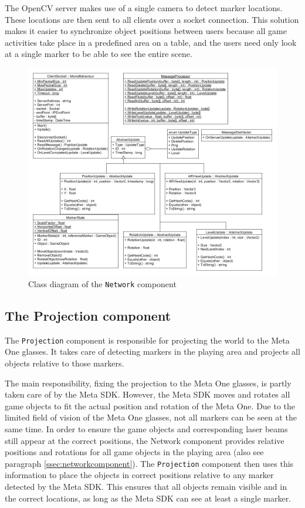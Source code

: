 			The OpenCV server makes use of a single camera to detect marker locations.
			These locations are then sent to all clients over a socket connection.
			This solution makes it easier to synchronize object positions between users
			because all game activities take place in a predefined area on a table,
			and the users need only look at a single marker to be able to see the 
			entire scene. 
			
			\begin{figure}[ht]
				\includegraphics[width=\textwidth]{ClassDiagramNetwork}
				\caption{Class diagram of the \texttt{Network} component}
				\label{fig:classdiagramnetwork}
			\end{figure}
			
		\subsection{The Projection component} \label{ssec:projectioncomponent}
			The \texttt{Projection} component is responsible for projecting the 
			world to the Meta One glasses. It takes care of detecting 
			markers in the playing area and projects all objects relative
			to those markers. 
			
			The main responsibility, fixing the projection to the Meta One 
			glasses, is partly taken care of by the Meta SDK. However, the 
			Meta SDK moves and rotates all game objects to fit the actual 
			position and rotation of the Meta One. Due to the limited field 
			of vision of the Meta One glasses, not all markers can be seen at 
			the same time. In order to ensure the game objects and 
			corresponding laser beams still appear at the correct positions,
			the Network component provides relative positions and rotations for 
			all game objects in the playing area (also see paragraph 
			\ref{ssec:networkcomponent}). The \texttt{Projection} component then uses
			this information to place the objects in correct positions relative
			to any marker detected by the Meta SDK. This ensures that all objects
			remain visible and in the correct locations, as long as the Meta SDK 
			can see at least a single marker.
			
